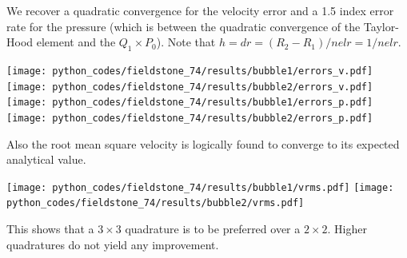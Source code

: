 We recover a quadratic convergence for the velocity error and a 1.5 index error rate for the 
pressure (which is between the quadratic convergence of the Taylor-Hood element 
and the $Q_1\times P_0$). Note that $h=dr=(R_2-R_1)/nelr=1/nelr$. 

\begin{center}
\texttt{[image: python\_codes/fieldstone\_74/results/bubble1/errors\_v.pdf]}
\texttt{[image: python\_codes/fieldstone\_74/results/bubble2/errors\_v.pdf]}\\
\texttt{[image: python\_codes/fieldstone\_74/results/bubble1/errors\_p.pdf]}
\texttt{[image: python\_codes/fieldstone\_74/results/bubble2/errors\_p.pdf]}
\end{center}


Also the root mean square velocity is logically found to converge to its 
expected analytical value.

\begin{center}
\texttt{[image: python\_codes/fieldstone\_74/results/bubble1/vrms.pdf]}
\texttt{[image: python\_codes/fieldstone\_74/results/bubble2/vrms.pdf]}
\end{center}

This shows that a $3\times 3$ quadrature is to be preferred over a $2\times 2$. 
Higher quadratures do not yield any improvement. 


